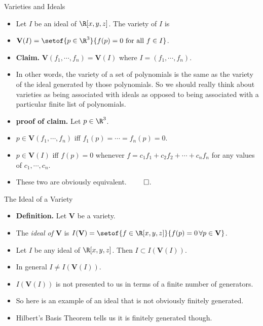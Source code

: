 \documentclass[handout]{beamer}
\begin{document}

\begin{frame}{Varieties and Ideals}

\begin{itemize}
  \item Let $I$ be an ideal of $\R[x,y,z]$. The variety of $I$ is
  \item $\mathbf{V}(I) = \setof{p\in\R^3}{f(p)=0\text{ for all } f\in I}$.
  \item \textbf{Claim.} $\mathbf{V}(f_1,\cdots,f_n) = \mathbf{V}(I)$ where $I = (f_1,\cdots,f_n)$.
  \item In other words, the variety of a set of polynomials is the same as the variety of the ideal generated by those polynomials.
  So we should really think about varieties as being associated with ideals as opposed to being associated with a particular finite list of polynomials.
  \item \textbf{proof of claim.} Let $p\in\R^3$.
  \item $p\in \mathbf{V}(f_1,\cdots,f_n)$ iff $f_1(p) = \cdots = f_n(p) = 0$.
  \item $p\in \mathbf{V}(I)$ iff $f(p)=0$ whenever $f=c_1f_1 + c_2f_2 + \cdots + c_nf_n$ for any values of $c_1,\cdots,c_n$.
  \item These two are obviously equivalent. $\qed$.
\end{itemize}
\end{frame}



\begin{frame}{The Ideal of a Variety}

\begin{itemize}
  \item \textbf{Definition.} Let $\mathbf{V}$ be a variety.
  \item The \emph{ideal of  $\mathbf{V}$} is $I(\mathbf{V}) = \setof{f\in\R[x,y,z]}{f(p) = 0 \, \forall p \in \mathbf{V}}$.
  \item Let $I$ be any ideal of $\R[x,y,z]$. Then $I\subset I(\mathbf{V}(I))$.
  \item In general $I\not= I(\mathbf{V}(I))$.
  \item $I(\mathbf{V}(I))$ is not presented to us in terms of a finite number of generators.
  \item So here is an example of an ideal that is not obviously finitely generated.
  \item Hilbert's Basis Theorem tells us it is finitely generated though.
\end{itemize}
\end{frame}
\end{document}

